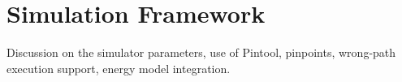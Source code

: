 \section{Simulation Framework}
\label{sec:simulation}

Discussion on the simulator parameters, use of Pintool, pinpoints, wrong-path
execution support, energy model integration.
